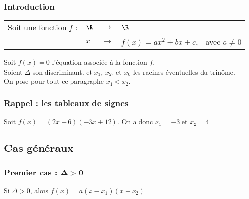 \subsubsection{Introduction}

\begin{tabular}{lllll}
Soit une fonction $f$ : & $\R$ & $\longrightarrow$ & $\R$ & \\
& $x$ & $\longrightarrow$ & $f\left(x\right) = ax^2 + bx + c$, & avec $a \neq 0$ \\ 
\end{tabular}

\vspace*{.3cm}

Soit $f\left(x\right) = 0$ l'équation associée à la fonction $f$. \\ Soient $\Delta$ son discriminant, et $x_1$, $x_2$, et $x_0$ les racines éventuelles du trinôme. \\

On pose pour tout ce paragraphe $x_1 < x_2$.

\subsubsection{Rappel : les tableaux de signes }

Soit $f\left(x\right) = \left(2x+6\right)\left(-3x+12\right)$. On a donc $x_1 = -3$ et $x_2 = 4$ \\


\subsection{Cas généraux}

\subsubsection{Premier cas : $\mathbf{\Delta > 0}$}

Si $\Delta > 0$, alors $f\left(x\right) = a\left(x-x_1\right)\left(x-x_2\right)$ \\


